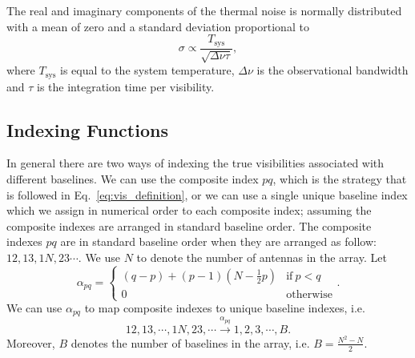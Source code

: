 \documentclass[useAMS,usenatbib]{mn2e}
\begin{document}
The real and imaginary components of the thermal noise is normally distributed with a mean of zero and a standard deviation proportional to   
\begin{equation}
\sigma \propto \frac{T_{\textrm{sys}}}{\sqrt{\Delta \nu \tau}}, 
\end{equation}
where $T_{\textrm{sys}}$ is equal to the system temperature, $\Delta \nu$ is the observational bandwidth and $\tau$ is the integration time per visibility. 

\subsection{Indexing Functions}
In general there are two ways of indexing the true visibilities associated with different baselines. We can use the composite index $pq$, which is the strategy that is followed in Eq.~\eqref{eq:vis_definition},
or we can use a single unique baseline index which we assign in numerical order to each composite index; assuming the composite indexes are arranged in standard baseline order.
The composite indexes $pq$ are in standard baseline order when they are arranged as follow: $12, 13, 1N, 23\cdots$. We use $N$ to denote the number of antennas in the array. Let 
\begin{equation}
\alpha_{pq} =
\begin{cases}
(q-p) + (p-1)\left (N-\frac{1}{2}p \right ) & \textrm{if}~p<q\\
0 & \textrm{otherwise}
\end{cases}.
\end{equation}
We can use $\alpha_{pq}$ to map composite indexes to unique baseline indexes, i.e. 
\begin{equation}
12,13,\cdots,1N,23,\cdots \xrightarrow{\alpha_{pq}} 1,2,3,\cdots,B.
\end{equation}
Moreover, $B$ denotes the number of baselines in the array, i.e. $B = \frac{N^2-N}{2}$.
\end{document}
